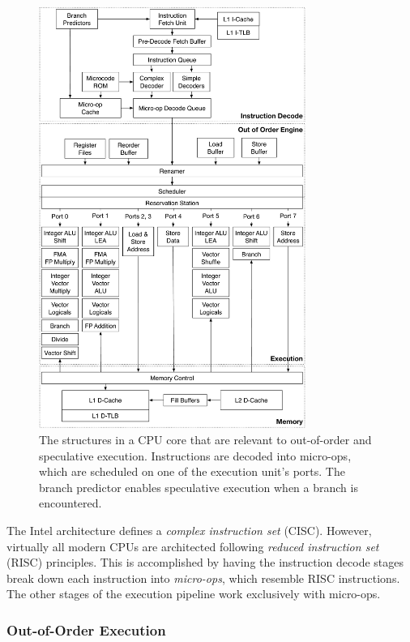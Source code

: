 \begin{figure}[hbt]
  \centering
  \includegraphics[width=87mm]{figures/cpu_out_of_order.pdf}
  \caption{
    The structures in a CPU core that are relevant to out-of-order and
    speculative execution. Instructions are decoded into micro-ops, which are
    scheduled on one of the execution unit's ports. The branch predictor
    enables speculative execution when a branch is encountered.
  }
  \label{fig:cpu_out_of_order}
\end{figure}


The Intel architecture defines a \textit{complex instruction set} (CISC).
However, virtually all modern CPUs are architected following \textit{reduced
instruction set} (RISC) principles. This is accomplished by having the
instruction decode stages break down each instruction into \textit{micro-ops},
which resemble RISC instructions. The other stages of the execution pipeline
work exclusively with micro-ops.


\subsubsection{Out-of-Order Execution}
\label{sec:execution_units}

